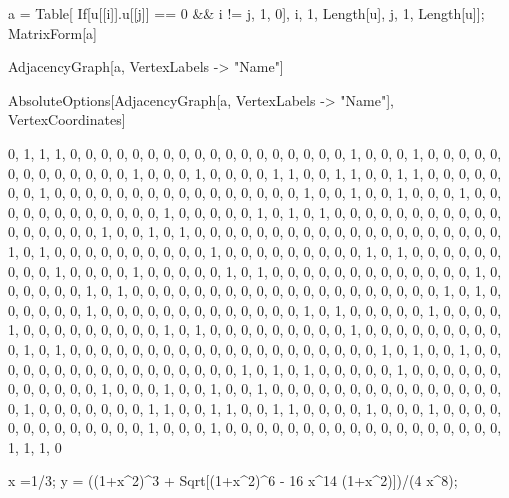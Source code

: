 a = Table[ If[u[[i]].u[[j]] == 0 && i != j, 1, 0], {i, 1, Length[u]}, {j, 1, Length[u]}];
MatrixForm[a]

AdjacencyGraph[a, VertexLabels -> "Name"]

AbsoluteOptions[AdjacencyGraph[a, VertexLabels -> "Name"], VertexCoordinates]



{
 {0, 1, 1, 1, 0, 0, 0, 0, 0, 0, 0, 0, 0, 0, 0, 0, 0, 0, 0, 0, 0, 0},
 {1, 0, 0, 0, 1, 0, 0, 0, 0, 0, 0, 0, 0, 0, 0, 0, 0, 0, 1, 0, 0, 0},
 {1, 0, 0, 0, 0, 1, 1, 0, 0, 1, 1, 0, 0, 1, 1, 0, 0, 0, 0, 0, 0, 0},
 {1, 0, 0, 0, 0, 0, 0, 0, 0, 0, 0, 0, 0, 0, 0, 0, 0, 1, 0, 0, 1, 0},
 {0, 1, 0, 0, 0, 1, 0, 0, 0, 0, 0, 0, 0, 0, 0, 0, 0, 0, 1, 0, 0, 0},
 {0, 0, 1, 0, 1, 0, 1, 0, 0, 0, 0, 0, 0, 0, 0, 0, 0, 0, 0, 0, 0, 0},
 {0, 0, 1, 0, 0, 1, 0, 1, 0, 0, 0, 0, 0, 0, 0, 0, 0, 0, 0, 0, 0, 0},
 {0, 0, 0, 0, 0, 0, 1, 0, 1, 0, 0, 0, 0, 0, 0, 0, 0, 0, 0, 1, 0, 0},
 {0, 0, 0, 0, 0, 0, 0, 1, 0, 1, 0, 0, 0, 0, 0, 0, 0, 0, 0, 1, 0, 0},
 {0, 0, 1, 0, 0, 0, 0, 0, 1, 0, 1, 0, 0, 0, 0, 0, 0, 0, 0, 0, 0, 0},
 {0, 0, 1, 0, 0, 0, 0, 0, 0, 1, 0, 1, 0, 0, 0, 0, 0, 0, 0, 0, 0, 0},
 {0, 0, 0, 0, 0, 0, 0, 0, 0, 0, 1, 0, 1, 0, 0, 0, 0, 0, 0, 1, 0, 0},
 {0, 0, 0, 0, 0, 0, 0, 0, 0, 0, 0, 1, 0, 1, 0, 0, 0, 0, 0, 1, 0, 0},
 {0, 0, 1, 0, 0, 0, 0, 0, 0, 0, 0, 0, 1, 0, 1, 0, 0, 0, 0, 0, 0, 0},
 {0, 0, 1, 0, 0, 0, 0, 0, 0, 0, 0, 0, 0, 1, 0, 1, 0, 0, 0, 0, 0, 0},
 {0, 0, 0, 0, 0, 0, 0, 0, 0, 0, 0, 0, 0, 0, 1, 0, 1, 0, 0, 1, 0, 0},
 {0, 0, 0, 0, 0, 0, 0, 0, 0, 0, 0, 0, 0, 0, 0, 1, 0, 1, 0, 1, 0, 0},
 {0, 0, 0, 1, 0, 0, 0, 0, 0, 0, 0, 0, 0, 0, 0, 0, 1, 0, 0, 0, 1, 0},
 {0, 1, 0, 0, 1, 0, 0, 0, 0, 0, 0, 0, 0, 0, 0, 0, 0, 0, 0, 0, 0, 1},
 {0, 0, 0, 0, 0, 0, 0, 1, 1, 0, 0, 1, 1, 0, 0, 1, 1, 0, 0, 0, 0, 1},
 {0, 0, 0, 1, 0, 0, 0, 0, 0, 0, 0, 0, 0, 0, 0, 0, 0, 1, 0, 0, 0, 1},
 {0, 0, 0, 0, 0, 0, 0, 0, 0, 0, 0, 0, 0, 0, 0, 0, 0, 0, 1, 1, 1, 0}
}



x =1/3;
y = ((1+x^2)^3 + Sqrt[(1+x^2)^6 - 16 x^14 (1+x^2)])/(4 x^8);



